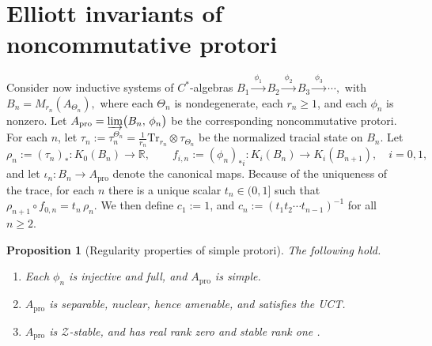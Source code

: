 \documentclass[11pt]{amsart}
\newtheorem{proposition}[theorem]{Proposition}
\theoremstyle{definition}
\theoremstyle{remark}
\newcommand{\Tr}{\mathrm{Tr}}
\newcommand{\ex}{\mathrm{pro}}
\begin{document}
\section{Elliott invariants of noncommutative protori}\label{sec:protorus-invariants}

Consider now inductive systems of $C^*$-algebras $B_1 \xrightarrow{\ \phi_1\ } B_2 \xrightarrow{\ \phi_2\ } B_3 \xrightarrow{\ \phi_3\ } \cdots,$ with
$B_n = M_{r_n}(A_{\Theta_n}),$
where each $\Theta_n$ is nondegenerate, each $r_n \geq 1$, and each $\phi_n$ is nonzero. Let 
$A_{\ex}=\varinjlim \bigl(B_n, \,\phi_n\bigr)$ be the corresponding noncommutative protori.  For each $n$, let $\tau_n:=\tau_n^{\Theta_n}=\frac{1}{r_n}\Tr_{r_n}\otimes\tau_{\Theta_n}$ be the normalized tracial state on $B_n$. Let
\[
\rho_n := (\tau_n)_* \colon K_0(B_n) \to \mathbb{R},
\qquad
f_{i,n} := (\phi_n)_{*i} \colon K_i(B_n) \to K_i(B_{n+1}), \quad i = 0,1,
\]
and let $\iota_n \colon B_n \to A_{\ex}$ denote the canonical maps. Because of the uniqueness of the trace, for each $n$ there is a unique scalar $t_n \in (0,1]$ such that $\rho_{n+1} \circ f_{0,n} = t_n\, \rho_n.$
We then define $c_1 := 1$, and $c_n := (t_1 t_2 \cdots t_{n-1})^{-1}$ for all $n \geq 2$.

\begin{proposition}[Regularity properties of simple protori]
\label{prop:protorus-regularity}
The following hold.

\begin{enumerate}[label={\rm(\roman*)}]
\item Each $\phi_n$ is injective and full, and $A_{\ex}$ is simple.
\item $A_{\ex}$ is separable, nuclear, hence amenable, and satisfies the UCT.
\item $A_{\ex}$ is $\mathcal Z$-stable, and has real rank zero and stable rank one .
\end{enumerate}
\end{proposition}
\end{document}
